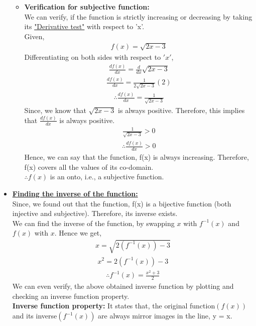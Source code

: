 \documentclass[journal,12pt,twocolumn]{IEEEtran}
\begin{document}
\begin{itemize}
\begin{itemize}
	\item
	\textbf{Verification for subjective function:}\\
	We can verify, if the function is strictly increasing or decreasing by taking its \underline{"Derivative test"} with respect to 'x'.\\
	Given,
	\begin{align}
		 f(x) = \sqrt{2x-3}
\end{align}
Differentiating on both sides with respect to $'x'$,
\begin{align}
\frac{df(x)}{dx} = \frac{d}{dx}\sqrt{2x-3}
\end{align}
\begin{align}
\frac{df(x)}{dx} = \frac{1}{2\sqrt{2x-3}}(2)
\end{align}
\begin{align}
\therefore\frac{df(x)}{dx} = \frac{1}{\sqrt{2x-3}}
\end{align}
Since, we know that $\sqrt{2x-3}$ is always positive. Therefore, this implies that $\frac{df(x)}{dx}$ is always positive.\\
\begin{align}
\frac{1}{\sqrt{2x-3}} > 0
\end{align}
\begin{align}
\therefore\frac{df(x)}{dx} > 0
\end{align}
Hence, we can say that the function, f(x) is always increasing. Therefore, f(x) covers all the values of its co-domain.\\
$\therefore f(x)$ is an onto, i.e., a subjective function.
	\end{itemize}
	\item
	\textbf{\underline{Finding the inverse of the function:}}\\
	Since, we found out that the function, f(x) is a bijective function (both injective and subjective). Therefore, its inverse exists.\\
	We can find the inverse of the function, by swapping $x$ with $f^{-1}(x)$ and $f(x)$ with $x$. Hence we get,
	\begin{align}
	x = \sqrt{2(f^{-1}(x)) - 3}
	\end{align}
	\begin{align}
	x^{2} = 2(f^{-1}(x)) - 3
	\end{align}
	\begin{align}
	\therefore f^{-1}(x) = \frac{x^{2} + 3}{2}
	\end{align}
	We can even verify, the above obtained inverse function by plotting and checking an inverse function property.\\
	\textbf{Inverse function property:} It states that, the original function$(f(x))$ and its inverse$(f^{-1}(x))$ are always mirror images in the line, y = x.
	\end{itemize}
\end{document}
